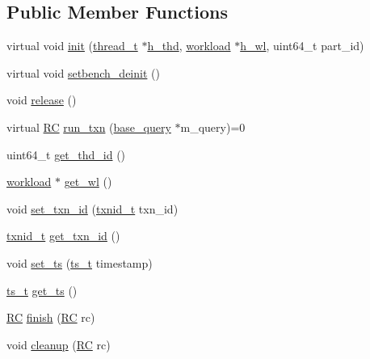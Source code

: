 \subsection*{Public Member Functions}
\begin{DoxyCompactItemize}
\item 
virtual void \hyperlink{classtxn__man_a778925bb3edd6a54a27161f67792edec}{init} (\hyperlink{classthread__t}{thread\+\_\+t} $\ast$\hyperlink{classtxn__man_a64bf2cba8ef2686ad528a96d18e8358d}{h\+\_\+thd}, \hyperlink{classworkload}{workload} $\ast$\hyperlink{classtxn__man_a988eb76c69a304049c02d3ceff526a5e}{h\+\_\+wl}, uint64\+\_\+t part\+\_\+id)
\item 
virtual void \hyperlink{classtxn__man_a9497c27260379a85a7d5983919868b8d}{setbench\+\_\+deinit} ()
\item 
void \hyperlink{classtxn__man_ae9762ca0f1e6fcac2094ea284375aa6e}{release} ()
\item 
virtual \hyperlink{global_8h_a78c49a674c810fdd03d20432f7be864a}{RC} \hyperlink{classtxn__man_a71142ded36a4be5629ea75d486a105ae}{run\+\_\+txn} (\hyperlink{classbase__query}{base\+\_\+query} $\ast$m\+\_\+query)=0
\item 
uint64\+\_\+t \hyperlink{classtxn__man_ae1c3f482994caa8cc40970b3bb62e529}{get\+\_\+thd\+\_\+id} ()
\item 
\hyperlink{classworkload}{workload} $\ast$ \hyperlink{classtxn__man_a0e873c5e1ac5fabe4555d443215ef0c5}{get\+\_\+wl} ()
\item 
void \hyperlink{classtxn__man_a5675d9c21c8b346b680eb06074f87af5}{set\+\_\+txn\+\_\+id} (\hyperlink{global_8h_a5b3a704dab2aafdcaadfe8c0909716ef}{txnid\+\_\+t} txn\+\_\+id)
\item 
\hyperlink{global_8h_a5b3a704dab2aafdcaadfe8c0909716ef}{txnid\+\_\+t} \hyperlink{classtxn__man_a26c38d64be1ad53236a0017f8c2ff9ff}{get\+\_\+txn\+\_\+id} ()
\item 
void \hyperlink{classtxn__man_a911fe878282152631d4da8b0b3ccde65}{set\+\_\+ts} (\hyperlink{global_8h_aaf095dfc9b10f757c968fe146ad7e724}{ts\+\_\+t} timestamp)
\item 
\hyperlink{global_8h_aaf095dfc9b10f757c968fe146ad7e724}{ts\+\_\+t} \hyperlink{classtxn__man_a1ed4112864a14e2d2ac24cc3ba90417a}{get\+\_\+ts} ()
\item 
\hyperlink{global_8h_a78c49a674c810fdd03d20432f7be864a}{RC} \hyperlink{classtxn__man_a05b5aa26d98420d0a913875e5f9c4226}{finish} (\hyperlink{global_8h_a78c49a674c810fdd03d20432f7be864a}{RC} rc)
\item 
void \hyperlink{classtxn__man_a8e3cbd946d40e7340f04f9b3760eac62}{cleanup} (\hyperlink{global_8h_a78c49a674c810fdd03d20432f7be864a}{RC} rc)

\end{DoxyCompactItemize}
